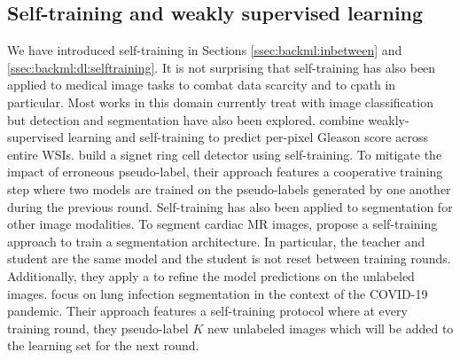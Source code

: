 \subsection{Self-training and weakly supervised learning}
\label{ssec:backdp:st}

We have introduced self-training in Sections \ref{ssec:backml:inbetween} and \ref{ssec:backml:dl:selftraining}. It is not surprising that self-training has also been applied to medical image tasks to combat data scarcity \cite{tajbakhsh2020embracing, peng2021medical} and to \acrlong{cpath} in particular. Most works in this domain currently treat with image classification \cite{peikari2018cluster, su2019local, koohbanani2021self, jaiswal2019semi, shaw2020teacher} but detection and segmentation have also been explored. \citeauthor{li2018based} \cite{li2018based} combine weakly-supervised learning and self-training to predict per-pixel Gleason score across entire WSIs. \citeauthor{li2019signet} \cite{li2019signet} build a signet ring cell detector using self-training. To mitigate the impact of erroneous pseudo-label, their approach features a cooperative training step where two models are trained on the pseudo-labels generated by one another during the previous round. Self-training has also been applied to segmentation for other image modalities. To segment cardiac MR images, \citeauthor{bai2017semi} \cite{bai2017semi} propose a self-training approach to train a segmentation architecture. In particular, the teacher and student are the same model and the student is not reset between training rounds. Additionally, they apply a  to refine the model predictions on the unlabeled images. \citeauthor{fan2020inf} \cite{fan2020inf} focus on lung infection segmentation in the context of the COVID-19 pandemic. Their approach features a self-training protocol where at every training round, they pseudo-label $K$ new unlabeled images which will be added to the learning set for the next round. 

